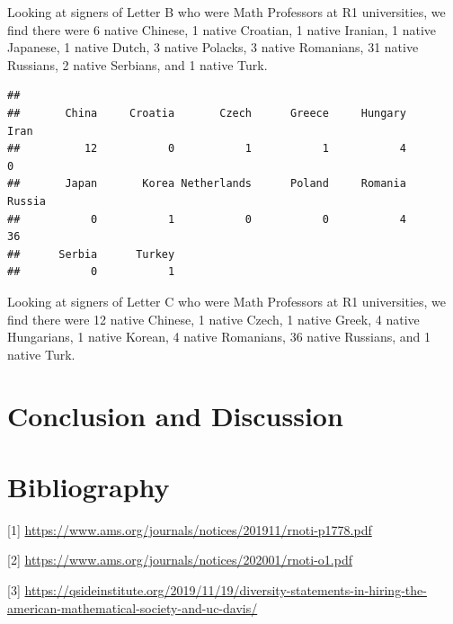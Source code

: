 \documentclass[]{article}
\newenvironment{Shaded}{\begin{snugshade}}{\end{snugshade}}
\newcommand{\KeywordTok}[1]{\textcolor[rgb]{0.13,0.29,0.53}{\textbf{#1}}}
\newcommand{\NormalTok}[1]{#1}
\newcommand{\OperatorTok}[1]{\textcolor[rgb]{0.81,0.36,0.00}{\textbf{#1}}}
\newcommand{\StringTok}[1]{\textcolor[rgb]{0.31,0.60,0.02}{#1}}
\begin{document}
Looking at signers of Letter B who were Math Professors at R1
universities, we find there were 6 native Chinese, 1 native Croatian, 1
native Iranian, 1 native Japanese, 1 native Dutch, 3 native Polacks, 3
native Romanians, 31 native Russians, 2 native Serbians, and 1 native
Turk.

\begin{Shaded}
\end{Shaded}

\begin{verbatim}
## 
##       China     Croatia       Czech      Greece     Hungary        Iran 
##          12           0           1           1           4           0 
##       Japan       Korea Netherlands      Poland     Romania      Russia 
##           0           1           0           0           4          36 
##      Serbia      Turkey 
##           0           1
\end{verbatim}

Looking at signers of Letter C who were Math Professors at R1
universities, we find there were 12 native Chinese, 1 native Czech, 1
native Greek, 4 native Hungarians, 1 native Korean, 4 native Romanians,
36 native Russians, and 1 native Turk.

\hypertarget{conclusion-and-discussion}{%
\section{Conclusion and Discussion}\label{conclusion-and-discussion}}

\hypertarget{bibliography}{%
\section{Bibliography}\label{bibliography}}

{[}1{]}
\url{https://www.ams.org/journals/notices/201911/rnoti-p1778.pdf}

{[}2{]} \url{https://www.ams.org/journals/notices/202001/rnoti-o1.pdf}

{[}3{]}
\url{https://qsideinstitute.org/2019/11/19/diversity-statements-in-hiring-the-american-mathematical-society-and-uc-davis/}
\end{document}
